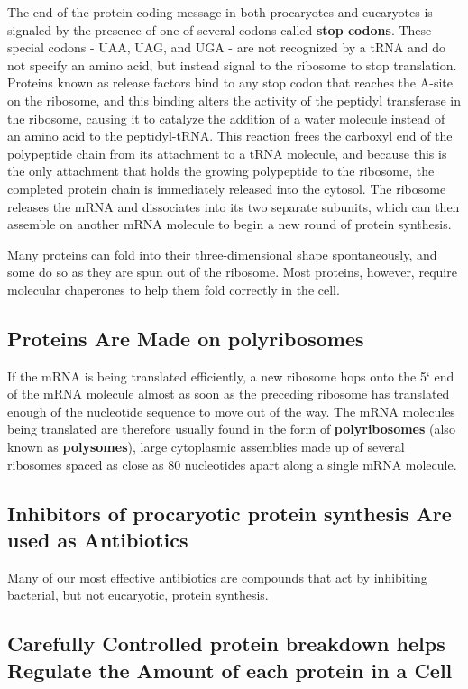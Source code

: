 The end of the protein-coding message in both procaryotes and eucaryotes
is signaled by the presence of one of several codons called \textbf{stop codons}.
These special codons - UAA, UAG, and UGA - are not
recognized by a tRNA and do not specify an amino acid, but instead signal
to the ribosome to stop translation. Proteins known as release factors bind
to any stop codon that reaches the A-site on the ribosome, and this binding
alters the activity of the peptidyl transferase in the ribosome, causing
it to catalyze the addition of a water molecule instead of an amino acid
to the peptidyl-tRNA. This reaction frees the carboxyl end
of the polypeptide chain from its attachment to a tRNA molecule, and
because this is the only attachment that holds the growing polypeptide to
the ribosome, the completed protein chain is immediately released into
the cytosol. The ribosome releases the mRNA and dissociates into its two
separate subunits, which can then assemble on another mRNA molecule
to begin a new round of protein synthesis.

Many proteins can fold into their three-dimensional shape spontaneously,
and some do so as they are spun out of the
ribosome. Most proteins, however, require molecular chaperones to help
them fold correctly in the cell.

\subsection{Proteins Are Made on polyribosomes}

If the mRNA is being translated efficiently, a new ribosome hops onto the 5`
end of the mRNA molecule almost as soon as the preceding ribosome has
translated enough of the nucleotide sequence to move out of the way.
The mRNA molecules being translated are therefore usually found in
the form of \textbf{polyribosomes} (also known as \textbf{polysomes}), large cytoplasmic
assemblies made up of several ribosomes spaced as close as 80 nucleotides
apart along a single mRNA molecule.

\subsection{Inhibitors of procaryotic protein synthesis Are used as Antibiotics}

Many of our most effective antibiotics are compounds that act by inhibiting
bacterial, but not eucaryotic, protein synthesis.

\subsection{Carefully Controlled protein breakdown helps Regulate the Amount of each protein in a Cell}

